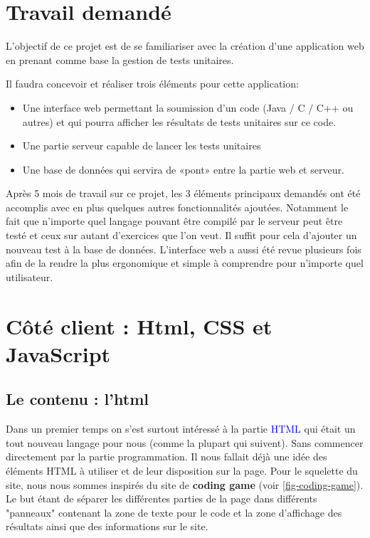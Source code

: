 \documentclass[a4paper]{article}
\renewcommand{\texttt}[2][blue]{\textcolor{#1}{\ttfamily #2}}
\begin{document}
\newpage

\section{Travail demandé}
\label{sec:label}

\begin{tcolorbox}
  L’objectif de ce projet est de se familiariser avec la création d’une
  application web en prenant comme base la gestion de tests unitaires.


  Il faudra concevoir et réaliser trois éléments pour cette application:
  \begin{itemize}%
  \item Une interface web permettant la soumission d’un code (Java / C / C++ ou
    autres) et qui pourra afficher les résultats de tests unitaires sur ce
    code.
  \item Une partie serveur capable de lancer les tests unitaires
  \item Une base de données qui servira de «pont» entre la partie web et serveur.
  \end{itemize}

\end{tcolorbox}

Après 5 mois de travail sur ce projet, les 3 éléments principaux demandés ont
été accomplis avec en plus quelques autres fonctionnalités ajoutées. Notamment
le fait que n'importe quel langage pouvant être compilé par le serveur peut
être testé et ceux sur autant d'exercices que l'on veut. Il suffit pour cela
d'ajouter un nouveau test à la base de données. L'interface web a aussi été
revue plusieurs fois afin de la rendre la plus ergonomique et simple à
comprendre pour n'importe quel utilisateur.

\section{Côté client : Html, CSS et JavaScript}
\label{sec:client}

\subsection{Le contenu : l'html}
\label{subsec:html}

Dans un premier temps on s'est surtout intéressé à la partie \texttt{HTML} qui
était un tout nouveau langage pour nous (comme la plupart qui suivent). Sans
commencer directement par la partie programmation. Il nous fallait déjà une
idée des éléments HTML à utiliser et de leur disposition sur la page. Pour le
squelette du site, nous nous sommes inspirés du site de \textbf{coding game}
(voir \ref{fig-coding-game}). Le but étant de séparer les différentes parties
de la page dans différents "panneaux" contenant la zone de texte pour le code et
la zone d'affichage des résultats ainsi que des informations sur le site.
\end{document}
